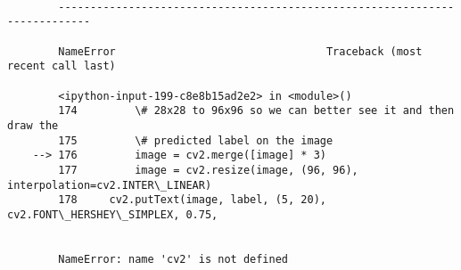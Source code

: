 \documentclass[11pt]{article}
\begin{document}
    \begin{Verbatim}[commandchars=\\\{\}]

        ---------------------------------------------------------------------------

        NameError                                 Traceback (most recent call last)

        <ipython-input-199-c8e8b15ad2e2> in <module>()
        174         \# 28x28 to 96x96 so we can better see it and then draw the
        175         \# predicted label on the image
    --> 176         image = cv2.merge([image] * 3)
        177         image = cv2.resize(image, (96, 96), interpolation=cv2.INTER\_LINEAR)
        178 	cv2.putText(image, label, (5, 20), cv2.FONT\_HERSHEY\_SIMPLEX, 0.75,


        NameError: name 'cv2' is not defined

    \end{Verbatim}

    \begin{center}
    \end{center}
    { \hspace*{\fill} \\}
    
\end{document}
